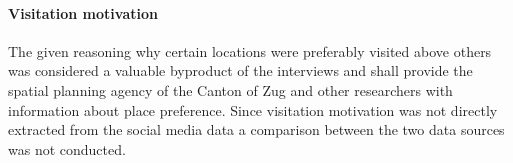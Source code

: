 \paragraph*{Visitation motivation}
The given reasoning why certain locations were preferably visited above others was considered a valuable byproduct of the interviews and shall provide the spatial planning agency of the Canton of Zug and other researchers with information about place preference. Since visitation motivation was not directly extracted from the social media data a comparison between the two data sources was not conducted.
















